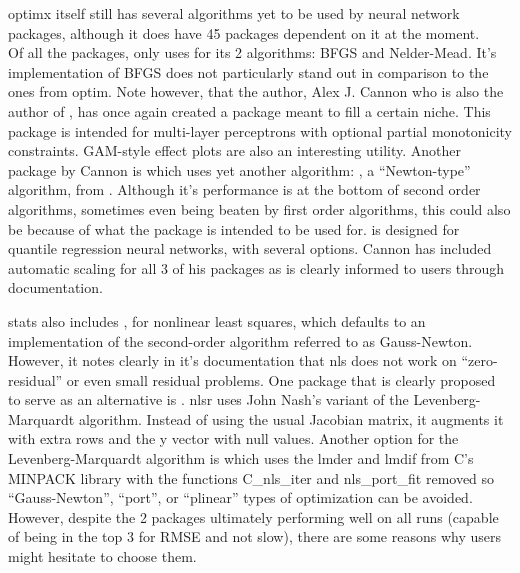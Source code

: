 optimx itself still has several algorithms yet to be used by neural
network packages, although it does have 45 packages dependent on it at
the moment.\\
Of all the packages, only  \citep{R-monmlp} uses
 for its 2 algorithms: BFGS and Nelder-Mead. It's
implementation of BFGS does not particularly stand out in comparison to
the ones from optim. Note however, that the author, Alex J. Cannon who
is also the author of , has once again created a
package meant to fill a certain niche. This package is intended for
multi-layer perceptrons with optional partial monotonicity constraints.
GAM-style effect plots are also an interesting utility. Another package
by Cannon is  \citep{R-qrnn} which uses yet another
algorithm: , a ``Newton-type'' algorithm, from
. Although it's performance is at the bottom of second
order algorithms, sometimes even being beaten by first order algorithms,
this could also be because of what the package is intended to be used
for.  is designed for quantile regression neural networks,
with several options. Cannon has included automatic scaling for all 3 of
his packages as is clearly informed to users through documentation.

stats also includes , for nonlinear least squares, which
defaults to an implementation of the second-order algorithm referred to
as Gauss-Newton. However, it notes clearly in it's documentation that
nls does not work on ``zero-residual'' or even small residual problems.
One package that is clearly proposed to serve as an alternative is
 \citep{R-nlsr}. nlsr uses John Nash's variant of the
Levenberg-Marquardt algorithm. Instead of using the usual Jacobian
matrix, it augments it with extra rows and the y vector with null
values. Another option for the Levenberg-Marquardt algorithm is
 \citep{minpack.lm} which uses the lmder and lmdif
from C's MINPACK library with the functions C\_nls\_iter and
nls\_port\_fit removed so ``Gauss-Newton'', ``port'', or ``plinear''
types of optimization can be avoided. However, despite the 2 packages
ultimately performing well on all runs (capable of being in the top 3
for RMSE and not slow), there are some reasons why users might hesitate
to choose them.

